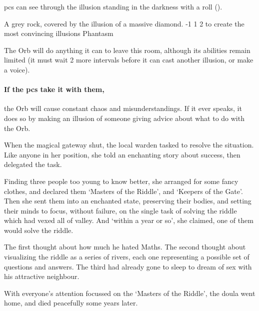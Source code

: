 \begin{multicols}{2}
\Glspl{pc} can see through the illusion standing in the darkness with a  roll
(\tn[12]).

  {A grey rock, covered by the illusion of a massive diamond.}%
  {-1}%
  {1}%
  {2}%
  {to create the most convincing illusions}%
  {Phantasm}%
  {
    \setcounter{Fire}{2}
    \setcounter{Earth}{2}
    \setcounter{Air}{2}
    \setcounter{Academics}{2}
    \setcounter{Survival}{1}
  }%

\showStdSpells[
  \setcounter{diceNo}{0}
]

The Orb will do anything it can to leave this room, although its abilities remain limited (it must wait 2 more \glspl{interval} before it can cast another illusion, or make a voice).

\paragraph{If the \glspl{pc} take it with them,}
the Orb will cause constant chaos and misunderstandings.
If it ever speaks, it does so by making an illusion of someone giving advice about what to do with the Orb.


\begin{exampletext}
  When the magical gateway shut, the local \gls{warden} tasked  to resolve the situation.
  Like anyone in her position, she told an enchanting story about success, then delegated the task.

  Finding three people too young to know better, she arranged for some fancy clothes, and declared them `Masters of the Riddle', and `Keepers of the Gate'.
  Then she sent them into an enchanted state, preserving their bodies, and setting their minds to focus, without failure, on the single task of solving the riddle which had vexed all of \gls{valley}.
  And `within a year or so', she claimed, one of them would solve the riddle.

  The first thought about how much he hated Maths.
  The second thought about visualizing the riddle as a series of rivers, each one representing a possible set of questions and answers.
  The third had already gone to sleep to dream of sex with his attractive neighbour.

  With everyone's attention focussed on the `Masters of the Riddle', the \gls{doula} went home, and died peacefully some years later.


\end{exampletext}
\end{multicols}
